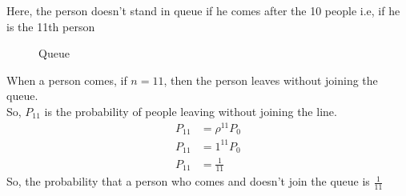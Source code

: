 \documentclass[journal,12pt,twocolumn]{IEEEtran}
\begin{document}
Here, the person doesn't stand in queue if he comes after the 10 people i.e, if he is the 11th person\\
\begin{figure}
    \centering
    \caption{Queue}
    \label{fig:my_label}
\end{figure}
When a person comes, if $n=11$, then the person leaves without joining the queue.\\ So, $P_{11}$ is the probability of people leaving without joining the line.
\begin{align}
    P_{11}&=\rho^{11} P_{0}\\
    P_{11}&=1^{11} P_{0}\\
    P_{11}&= \frac{1}{11}
\end{align}
So, the probability that a person who comes and doesn't join the queue is $\frac{1}{11}$
\end{document}
